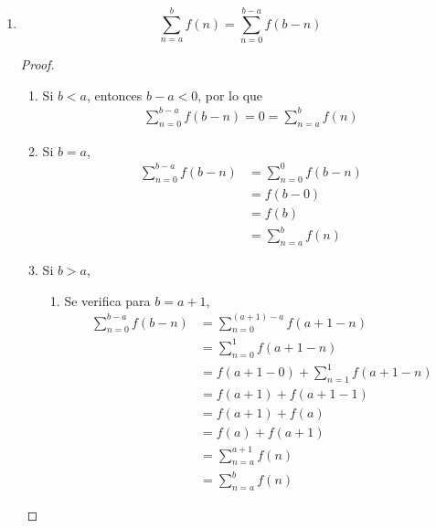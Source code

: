 \begin{enumerate}[label=\alph*)]
\begin{enumerate}[label=\Roman*)]
   \[\sum_{n=a}^{b}f(n) = \sum_{n=0}^{b} f(n) - \sum_{n=0}^{a-1} f(n)\]
  \begin{proof}\leavevmode
    \begin{align*}
      \sum_{n=0}^{b} f(n) - \sum_{n=0}^{a-1} f(n) &= \sum_{n=0}^{a} f(n) + \sum_{a+1}^{b} f(n) - \sum_{n=0}^{a-1}f(n) && \text{Partir la suma}\\
      &= \sum_{n=0}^{a-1} f(n) + \sum_{n=a}^{a} f(n) + \sum_{a+1}^{b} f(n) - \sum_{n=0}^{a-1}f(n) && \text{Partir la suma}\\
      &= \sum_{n=a}^{a} f(n) + \sum_{a+1}^{b} f(n)\\
      &= \sum_{n=a}^{b}f(n)
    \end{align*}
  \end{proof}

  \end{enumerate}

  \item \[\sum_{n=a}^{b}f(n) = \sum_{n=0}^{b-a} f(b-n)\]
  \begin{proof}\leavevmode
    \begin{enumerate}[label=\Roman*)]
    \item Si $b<a$, entonces $b-a<0$, por lo que
    \begin{align*}
      \sum_{n=0}^{b-a} f(b-n) = 0 = \sum_{n=a}^{b}f(n)
    \end{align*}
    
    \item Si $b=a$,
    \begin{align*}
      \sum_{n=0}^{b-a} f(b-n) &= \sum_{n=0}^{0} f(b-n)\\
      &= f(b-0)\\
      &= f(b)\\
      &= \sum_{n=a}^{b} f(n)
    \end{align*}
    

    \item Si $b>a$,
    \begin{enumerate}[label=\roman*)]
      \item Se verifica para $b=a+1$,
      \begin{align*}
        \sum_{n=0}^{b-a} f(b-n) &= \sum_{n=0}^{(a+1)-a} f(a+1-n)\\
        &= \sum_{n=0}^{1} f(a+1-n)\\
        &= f(a+1-0) + \sum_{n=1}^{1} f(a+1-n)\\
        &= f(a+1) + f(a+1-1)\\
        &= f(a+1) + f(a)\\
        &= f(a) + f(a+1)\\
        &= \sum_{n=a}^{a+1} f(n)\\
        &= \sum_{n=a}^{b} f(n)
      \end{align*}


\end{enumerate}
\end{enumerate}
\end{proof}
\end{enumerate}
